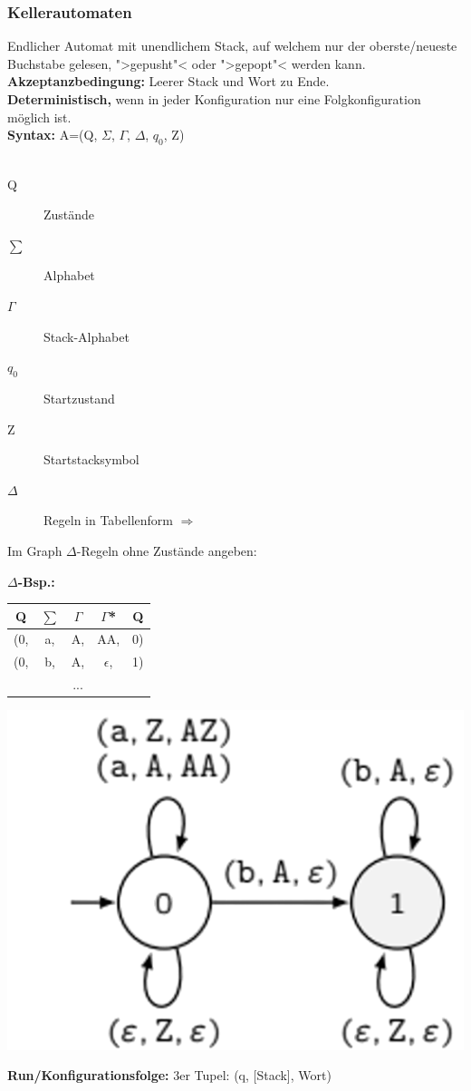 \documentclass[12pt,a4paper]{article}
\begin{document}
	\subsubsection{Kellerautomaten}
	Endlicher Automat mit unendlichem Stack, auf welchem nur der oberste/neueste Buchstabe gelesen, ">gepusht"< oder ">gepopt"< werden kann.\\
	\textbf{Akzeptanzbedingung: } Leerer Stack und Wort zu Ende.\\
	\textbf{Deterministisch, } wenn in jeder Konfiguration nur eine Folgkonfiguration möglich ist.\\
	\textbf{Syntax:} A=(Q, $\Sigma$, $\Gamma$, $\Delta$, $q_0$, Z)\\\\
	\begin{minipage}[c]{0.5\textwidth}
		\begin{description}
			\item[Q] Zustände
			\item[$\sum$] Alphabet
			\item[$\Gamma$] Stack-Alphabet
			\item[$q_0$] Startzustand
			\item[Z] Startstacksymbol  
			\item[$\Delta$] Regeln in Tabellenform $\Rightarrow$
		\end{description}
		Im Graph $\Delta$-Regeln ohne Zustände angeben:
	\end{minipage}
	\begin{minipage}[c]{0.5\textwidth}
		$\Delta$\textbf{-Bsp.:}\\
		\begin{tabular}[h]{c|c|c|c|c}
			Q & $\sum$ & $\Gamma$ & $\Gamma$* & Q\\
			\hline
			(0, & a, & A, & AA, & 0)\\
			(0, & b, & A, & $\epsilon$, & 1)\\
			&&...
		\end{tabular}
		\includegraphics[scale=0.3]{Bilder/KellerAutomat.png}
	\end{minipage}
	\textbf{Run/Konfigurationsfolge:} 3er Tupel: (q, [Stack], Wort)
\end{document}
